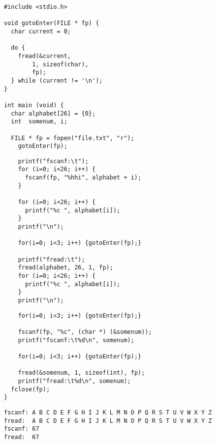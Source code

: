 
\begin{frame}[fragile]
%
%
\begin{codebox}
\begin{verbatim}
#include <stdio.h>

void gotoEnter(FILE * fp) {
  char current = 0;
  
  do {
    fread(&current, 
        1, sizeof(char), 
        fp);
  } while (current != '\n');
}

int main (void) {
  char alphabet[26] = {0};
  int  somenum, i;
  
  FILE * fp = fopen("file.txt", "r");
    gotoEnter(fp);
\end{verbatim}
\end{codebox}
%
\begin{codebox}[... Fortsetzung ...]
\begin{verbatim}
    printf("fscanf:\t");
    for (i=0; i<26; i++) {
      fscanf(fp, "%hhi", alphabet + i);
    }
    
    for (i=0; i<26; i++) {
      printf("%c ", alphabet[i]);
    }
    printf("\n");
    
    for(i=0; i<3; i++) {gotoEnter(fp);}
    
    printf("fread:\t");
    fread(alphabet, 26, 1, fp);
    for (i=0; i<26; i++) {
      printf("%c ", alphabet[i]);
    }
    printf("\n");
\end{verbatim}
\end{codebox}
%
\end{frame}


\begin{frame}[fragile]
%
\begin{codebox}[... Fortsetzung]
\begin{verbatim}
    for(i=0; i<3; i++) {gotoEnter(fp);}
    
    fscanf(fp, "%c", (char *) (&somenum));
    printf("fscanf:\t%d\n", somenum);
    
    for(i=0; i<3; i++) {gotoEnter(fp);}
    
    fread(&somenum, 1, sizeof(int), fp);
    printf("fread:\t%d\n", somenum);
  fclose(fp);
}
\end{verbatim}
\end{codebox}
%
\begin{cmdbox}[Ausgabe]
\begin{verbatim}
fscanf: A B C D E F G H I J K L M N O P Q R S T U V W X Y Z 
fread:  A B C D E F G H I J K L M N O P Q R S T U V W X Y Z 
fscanf: 67
fread:  67
\end{verbatim}
\end{cmdbox}
%
\end{frame}

